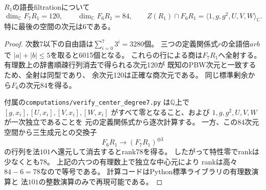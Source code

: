\begin{proposition}[有限次数中心の独立計算証明]
\label{prop:quotient-verified-center6}
$R_1$の語長filtrationについて
\[
 \dim_{\mathbb C}F_7R_1=120,\qquad
 \dim_{\mathbb C}F_6R_1=84,\qquad
 Z(R_1)\cap F_6R_1=\langle1,g,g^2,U,V,W\rangle_{\mathbb C}.
\]
特に最後の空間の次元は6である。
\end{proposition}
\begin{proof}
次数7以下の自由語は$\sum_{i=0}^7 3^i=3280$個。
三つの定義関係式$r$の全語倍$arb$で
$|a|+|b|\le5$を取ると6015個となる。
これらの行による商は$F_7R_1$へ全射する。
有理数上の辞書順疎行列消去で得られる次元120が
既知のPBW次元と一致するため、全射は同型であり、
余次元120は正確な商次元である。
同じ標準剰余から$F_6$の次元84を得る。

付属の\texttt{computations/verify\_center\_degree7.py}
は$\mathbb Q$上で$[g,x_i],[U,x_i],[V,x_i],[W,x_i]$
がすべて零となること、および
$1,g,g^2,U,V,W$が一次独立であることを
元の定義関係式から逐次計算する。
一方、この84次元空間から三生成元との交換子
\[
 F_6R_1\longrightarrow(F_7R_1)^{\oplus3}
\]
の行列を法$101$へ還元して消去するとrank78を得る。
したがって特性零でrankは少なくとも78。
上記の六つの有理数上で独立な中心元により
rankは高々$84-6=78$なので等号である。
計算コードはPython標準ライブラリの有理数演算と
法$101$の整数演算のみで再現可能である。
\end{proof}

